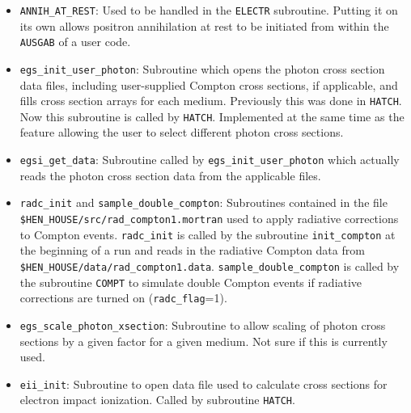 \begin{itemize}

\item 
{}
{\tt ANNIH\_AT\_REST}: Used to be handled in the {\tt ELECTR} subroutine.
Putting it on its own allows positron annihilation at rest to be initiated
from within the {\tt AUSGAB} of a user code.

\item
{}
{\tt egs\_init\_user\_photon}: Subroutine which opens the photon
cross section data files, including user-supplied Compton cross sections,
if applicable, and fills cross section arrays for each medium.  Previously
this was done in {\tt HATCH}.  Now this subroutine is called by {\tt HATCH}.
Implemented at the same time as the feature allowing the user to select
different photon cross sections.

\item
{}
{\tt egsi\_get\_data}: Subroutine called by
{\tt egs\_init\_user\_photon} which actually reads the photon
cross section data from the applicable files.

\item 
{}
{\tt radc\_init} and {\tt sample\_double\_compton}: Subroutines contained
in the file\\ {\tt \$HEN\_HOUSE/src/rad\_compton1.mortran} used to apply
radiative corrections to Compton events.  {\tt radc\_init} is called by
the subroutine {\tt init\_compton} at the beginning of a run and reads
in the radiative Compton data from {\tt \$HEN\_HOUSE/data/rad\_compton1.data}.
{\tt sample\_double\_compton} is called by the subroutine {\tt COMPT} to
simulate double Compton events if radiative corrections are turned
on ({\tt radc\_flag}=1).

\item 
{}
{\tt egs\_scale\_photon\_xsection}: Subroutine to allow scaling of 
photon cross sections by a given factor for a given medium.  Not sure if
this is currently used.

\item
{}
{\tt eii\_init}: Subroutine to open data file used to calculate
cross sections for electron impact ionization.  Called by subroutine
{\tt HATCH}.


\end{itemize}

